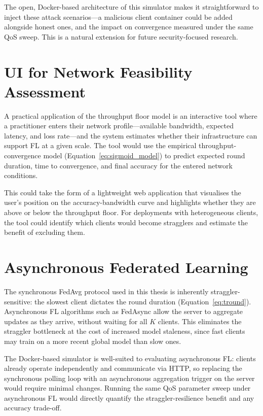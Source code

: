 \documentclass[12pt,a4paper]{report}
\begin{document}
The open, Docker-based architecture of this simulator makes it
straightforward to inject these attack scenarios---a malicious client
container could be added alongside honest ones, and the impact on
convergence measured under the same QoS sweep.  This is a natural
extension for future security-focused research.

\section{UI for Network Feasibility Assessment}

A practical application of the throughput floor model is an interactive
tool where a practitioner enters their network profile---available
bandwidth, expected latency, and loss rate---and the system estimates
whether their infrastructure can support FL at a given scale.  The tool
would use the empirical throughput-convergence model
(Equation~\ref{eq:sigmoid_model}) to predict expected round duration,
time to convergence, and final accuracy for the entered network
conditions.

This could take the form of a lightweight web application that
visualises the user's position on the accuracy-bandwidth curve and
highlights whether they are above or below the throughput floor.  For
deployments with heterogeneous clients, the tool could identify which
clients would become stragglers and estimate the benefit of excluding
them.

\section{Asynchronous Federated Learning}

The synchronous FedAvg protocol used in this thesis is inherently
straggler-sensitive: the slowest client dictates the round duration
(Equation~\ref{eq:tround}).  Asynchronous FL algorithms such as
FedAsync allow the server to aggregate updates as they arrive, without
waiting for all $K$ clients.  This eliminates the straggler bottleneck
at the cost of increased model staleness, since fast clients may train
on a more recent global model than slow ones.

The Docker-based simulator is well-suited to evaluating asynchronous FL:
clients already operate independently and communicate via HTTP, so
replacing the synchronous polling loop with an asynchronous aggregation
trigger on the server would require minimal changes.  Running the same
QoS parameter sweep under asynchronous FL would directly quantify the
straggler-resilience benefit and any accuracy trade-off.
\end{document}
